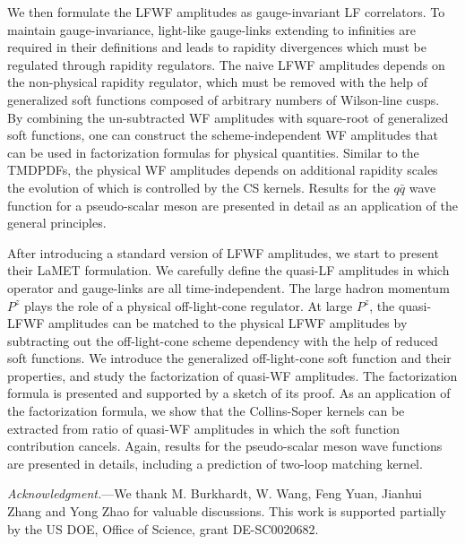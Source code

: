 \documentclass[twocolumn,superscriptaddress,longbibliography,10pt]{revtex4-1}
\begin{document}
We then formulate the LFWF amplitudes as gauge-invariant LF correlators. To maintain gauge-invariance, light-like gauge-links extending to infinities are required in their definitions and leads to rapidity divergences which must be regulated through rapidity regulators. The naive LFWF amplitudes depends on the non-physical rapidity regulator, which must be removed with the help of generalized soft functions composed of arbitrary numbers of Wilson-line cusps. By combining the un-subtracted WF amplitudes with square-root of generalized soft functions, one can construct the scheme-independent WF amplitudes that can be used in factorization formulas for physical quantities. Similar to the TMDPDFs, the physical WF amplitudes depends on additional rapidity scales the evolution of which is controlled by the CS kernels. Results for the $q\bar q$ wave function for a pseudo-scalar meson are presented in detail as an application of the general principles.

After introducing a standard version of LFWF amplitudes, we start to present their LaMET formulation. We carefully define the quasi-LF amplitudes in which operator and gauge-links are all time-independent. The large hadron momentum $P^z$ plays the role of a physical off-light-cone regulator. At large $P^z$, the quasi-LFWF amplitudes can be matched to the physical LFWF amplitudes by subtracting out the off-light-cone scheme dependency with the help of reduced soft functions. We introduce the generalized off-light-cone soft function and their properties, and study the factorization of quasi-WF amplitudes. The factorization formula is presented and supported by a sketch of its proof. As an application of the factorization formula, we show that the Collins-Soper kernels can be extracted from ratio of quasi-WF amplitudes in which the soft function contribution cancels.  Again, results for the pseudo-scalar meson wave functions are presented in details, including a prediction of two-loop matching kernel.

{\it Acknowledgment.}---We thank M. Burkhardt, W. Wang, Feng Yuan, Jianhui Zhang and Yong Zhao for valuable discussions. This work is supported partially by the US DOE, Office of Science, grant DE-SC0020682.




\end{document}
